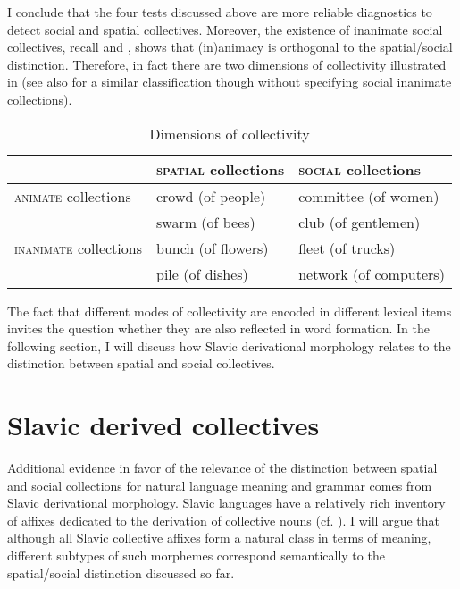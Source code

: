 \documentclass[output=paper]{langscibook}
\begin{document}
\noindent I conclude that the four tests discussed above are more reliable diagnostics to detect social and spatial collectives. Moreover, the existence of inanimate social collectives, recall  and , shows that (in)animacy is orthogonal to the spatial/social distinction. Therefore, in fact there are two dimensions of collectivity illustrated in  (see also \citealt{zwarts2020contiguity} for a similar classification though without specifying social inanimate collections).

\begin{table}[h!]
\centering
	\caption{Dimensions of collectivity} 
	\label{wan:tab:dimensions-of-collectivity}
	\begin{tabular}{lll} 
		\toprule
		& \textsc{spatial} collections & \textsc{social} collections \\ 
		\midrule
		\textsc{animate} collections  &   crowd (of people) 
		&    committee (of women) 
		\\
		& swarm (of bees) & club (of gentlemen) \\ \tablevspace
		\textsc{inanimate} collections  &   bunch (of flowers) 
		&   fleet (of trucks)  \\
		& pile (of dishes) & network (of computers)\\
		\bottomrule
	\end{tabular}
\end{table}

The fact that different modes of collectivity are encoded in different lexical items invites the question whether they are also reflected in word formation. In the following section, I will discuss how Slavic derivational morphology relates to the distinction between spatial and social collectives.

\section{Slavic derived collectives}\label{wan:sec:slavic-derived-collectives}

Additional evidence in favor of the relevance of the distinction between spatial and social collections for natural language meaning and grammar comes from Slavic derivational morphology. Slavic languages have a relatively rich inventory of affixes dedicated to the derivation of collective nouns (cf. \citealt{mozdzierz1994forms,ojeda_grivicic2005semantics,mitrovic2011count,tomic2012grammar,arsenijevic2017gender,grimm_docekal-toappear-counting}). I will argue that although all Slavic collective affixes form a natural class in terms of meaning, different subtypes of such morphemes correspond semantically to the spatial/social distinction discussed so far.
\end{document}
